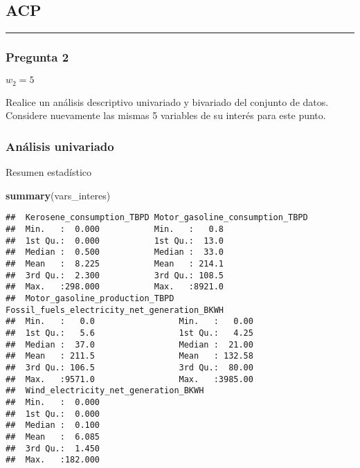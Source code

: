 \documentclass[
]{article}
\newenvironment{Shaded}{\begin{snugshade}}{\end{snugshade}}
\newcommand{\FunctionTok}[1]{\textcolor[rgb]{0.13,0.29,0.53}{\textbf{#1}}}
\newcommand{\NormalTok}[1]{#1}
\begin{document}
\subsection{ACP}\label{acp}

\begin{center}\rule{0.5\linewidth}{0.5pt}\end{center}

\subsubsection{Pregunta 2}\label{pregunta-2}

\(w_2=5\)

Realice un análisis descriptivo univariado y bivariado del conjunto de
datos. Considere nuevamente las mismas 5 variables de su interés para
este punto.

\subsubsection{Análisis univariado}\label{anuxe1lisis-univariado}

Resumen estadístico

\begin{Shaded}
\begin{Highlighting}[]
\FunctionTok{summary}\NormalTok{(vars\_interes)}
\end{Highlighting}
\end{Shaded}

\begin{verbatim}
##  Kerosene_consumption_TBPD Motor_gasoline_consumption_TBPD
##  Min.   :  0.000           Min.   :   0.8                 
##  1st Qu.:  0.000           1st Qu.:  13.0                 
##  Median :  0.500           Median :  33.0                 
##  Mean   :  8.225           Mean   : 214.1                 
##  3rd Qu.:  2.300           3rd Qu.: 108.5                 
##  Max.   :298.000           Max.   :8921.0                 
##  Motor_gasoline_production_TBPD Fossil_fuels_electricity_net_generation_BKWH
##  Min.   :   0.0                 Min.   :   0.00                             
##  1st Qu.:   5.6                 1st Qu.:   4.25                             
##  Median :  37.0                 Median :  21.00                             
##  Mean   : 211.5                 Mean   : 132.58                             
##  3rd Qu.: 106.5                 3rd Qu.:  80.00                             
##  Max.   :9571.0                 Max.   :3985.00                             
##  Wind_electricity_net_generation_BKWH
##  Min.   :  0.000                     
##  1st Qu.:  0.000                     
##  Median :  0.100                     
##  Mean   :  6.085                     
##  3rd Qu.:  1.450                     
##  Max.   :182.000
\end{verbatim}
\end{document}
